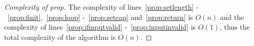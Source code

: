 \begin{proof}[Complexity of prop]
   The complexity of lines~\ref{prop:setlength} -~\ref{prop:finit},~\ref{prop:loop} -~\ref{prop:setcap} and~\ref{prop:return}
   is $O\left(n\right)$ and the complexity of lines~\ref{prop:ifinputvalid} -~\ref{prop:inputinvalid} is $O\left(1\right)$,
   thus the total complexity of the algorithm is $O\left(n\right)$.
\end{proof}
